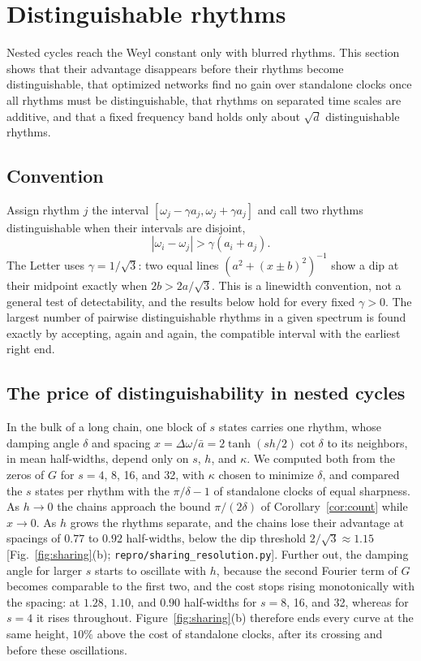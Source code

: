 \section{Distinguishable rhythms}\label{sec:resolved}

Nested cycles reach the Weyl constant only with blurred rhythms. This section shows that their advantage disappears before their rhythms become distinguishable, that optimized networks find no gain over standalone clocks once all rhythms must be distinguishable, that rhythms on separated time scales are additive, and that a fixed frequency band holds only about $\sqrt d$ distinguishable rhythms.

\subsection{Convention}

Assign rhythm $j$ the interval $[\omega_j-\gamma a_j,\omega_j+\gamma a_j]$ and call two rhythms distinguishable when their intervals are disjoint,
\begin{equation}
|\omega_i-\omega_j|>\gamma(a_i+a_j).
\label{eq:S-resolved}
\end{equation}
The Letter uses $\gamma=1/\sqrt3$: two equal lines $(a^2+(x\pm b)^2)^{-1}$ show a dip at their midpoint exactly when $2b>2a/\sqrt3$. This is a linewidth convention, not a general test of detectability, and the results below hold for every fixed $\gamma>0$. The largest number of pairwise distinguishable rhythms in a given spectrum is found exactly by accepting, again and again, the compatible interval with the earliest right end.

\subsection{The price of distinguishability in nested cycles}\label{sec:price}

In the bulk of a long chain, one block of $s$ states carries one rhythm, whose damping angle $\delta$ and spacing $x=\Delta\omega/\bar a=2\tanh(sh/2)\cot\delta$ to its neighbors, in mean half-widths, depend only on $s$, $h$, and $\kappa$. We computed both from the zeros of $G$ for $s=4$, 8, 16, and 32, with $\kappa$ chosen to minimize $\delta$, and compared the $s$ states per rhythm with the $\pi/\delta-1$ of standalone clocks of equal sharpness. As $h\to0$ the chains approach the bound $\pi/(2\delta)$ of Corollary~\ref{cor:count} while $x\to0$. As $h$ grows the rhythms separate, and the chains lose their advantage at spacings of $0.77$ to $0.92$ half-widths, below the dip threshold $2/\sqrt3\approx1.15$ [Fig.~\ref{fig:sharing}(b); \texttt{repro/sharing\_resolution.py}]. Further out, the damping angle for larger $s$ starts to oscillate with $h$, because the second Fourier term of $G$ becomes comparable to the first two, and the cost stops rising monotonically with the spacing: at $1.28$, $1.10$, and $0.90$ half-widths for $s=8$, 16, and 32, whereas for $s=4$ it rises throughout. Figure~\ref{fig:sharing}(b) therefore ends every curve at the same height, $10\%$ above the cost of standalone clocks, after its crossing and before these oscillations.

